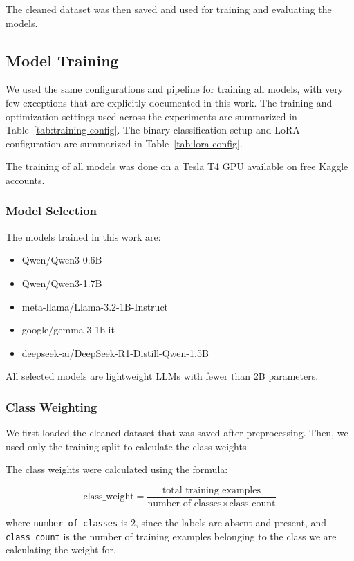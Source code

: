 The cleaned dataset was then saved and used for training and evaluating the models.

\subsection{Model Training}
\label{subsec:model-training}

We used the same configurations and pipeline for training all models, with very few exceptions that are explicitly documented in this work. The training and optimization settings used across the experiments are summarized in Table~\ref{tab:training-config}. The binary classification setup and LoRA configuration are summarized in Table~\ref{tab:lora-config}.

The training of all models was done on a Tesla T4 GPU available on free Kaggle accounts.

\subsubsection{Model Selection}

The models trained in this work are:

\begin{itemize}
\item Qwen/Qwen3-0.6B
\item Qwen/Qwen3-1.7B
\item meta-llama/Llama-3.2-1B-Instruct
\item google/gemma-3-1b-it
\item deepseek-ai/DeepSeek-R1-Distill-Qwen-1.5B
\end{itemize}

All selected models are lightweight LLMs with fewer than 2B parameters.

\subsubsection{Class Weighting}
\label{subsubsec:class-weighting}

We first loaded the cleaned dataset that was saved after preprocessing. Then, we used only the training split to calculate the class weights.

The class weights were calculated using the formula:

\[
\text{class\_weight} = \frac{\text{total training examples}}{\text{number of classes} \times \text{class count}}
\]

where \texttt{number\_of\_classes} is 2, since the labels are absent and present, and \texttt{class\_count} is the number of training examples belonging to the class we are calculating the weight for.

